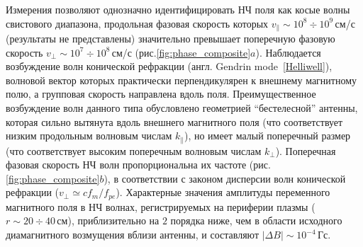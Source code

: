 \documentclass[autoref,10pt]{disser}
\begin{document}

Измерения позволяют однозначно идентифицировать НЧ поля как косые волны свистового диапазона, продольная фазовая скорость которых $v_{\parallel}\sim 10^8 \div 10^9$\,см/с (результаты не представлены) значительно превышает поперечную фазовую скорость $v_{\perp}\sim 10^7 \div 10^8$\,см/с (\mbox{рис.\ref{fig:phase_composite}$a$}). Наблюдается возбуждение волн конической рефракции (англ. Gendrin mode~\ref{Helliwell}), волновой вектор которых практически перпендикулярен к внешнему магнитному полю, а групповая скорость направлена вдоль поля. Преимущественное возбуждение волн данного типа обусловлено геометрией ``бестелесной'' антенны, которая сильно вытянута вдоль внешнего магнитного поля (что соответствует низким продольным волновым числам $k_{\parallel}$), но имеет малый поперечный размер (что соответствует высоким поперечным волновым числам $k_{\perp}$). Поперечная фазовая скорость НЧ волн пропорциональна их частоте (\mbox{рис.\ref{fig:phase_composite}$b$)}, в соответствии с законом дисперсии волн конической рефракции ($v_{\perp}\simeq c f_m/f_{pe}$). Характерные значения амплитуды переменного магнитного поля в НЧ волнах, регистрируемых на периферии плазмы ($r\sim 20\div 40$\,см), приблизительно на $2$ порядка ниже, чем в области исходного диамагнитного возмущения вблизи антенны, и составляют $|\Delta B|\sim 10^{-4}$\,Гс.
\end{document}
